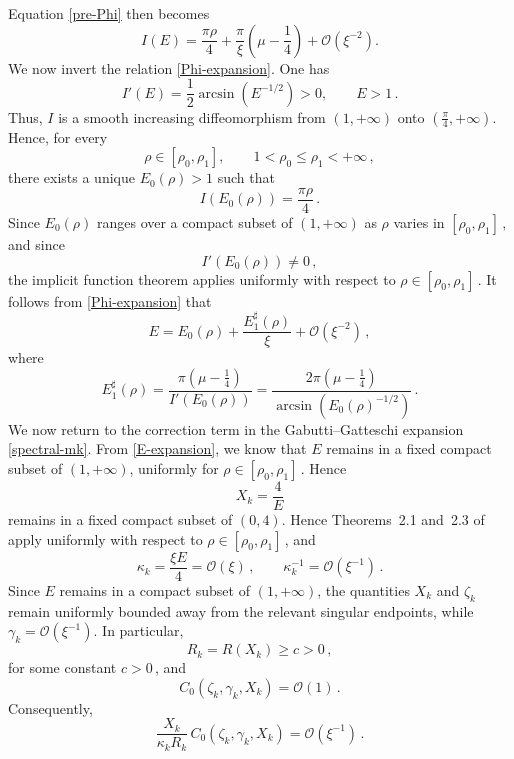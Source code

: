 \documentclass[11pt]{amsart}
\numberwithin{equation}{section}
\theoremstyle{remark}
\newcommand{\action}{I}
\begin{document}
Equation \eqref{pre-Phi} then becomes
\begin{equation}\label{Phi-expansion}
\action(E)
=
\frac{\pi\rho}{4}
+
\frac{\pi}{\xi}
\left(
\mu-\frac14
\right)
+
\mathcal O(\xi^{-2}).
\end{equation}
We now invert the relation \eqref{Phi-expansion}. One has
\begin{equation}\label{Phi-prime}
\action'(E)
=
\frac12\arcsin(E^{-1/2})
>0,
\qquad E>1\,.
\end{equation}
Thus, \(I\) is a smooth increasing diffeomorphism from
\((1,+\infty)\) onto \( (\frac{\pi}{4},+\infty) \). Hence, for every
\[
\rho\in[\rho_0,\rho_1],
\qquad 1<\rho_0\le \rho_1<+\infty\,,
\]
there exists a unique \(E_0(\rho)>1\) such that
\begin{equation}\label{E0-def}
\action(E_0(\rho))
=
\frac{\pi\rho}{4}\,.
\end{equation}
Since \(E_0(\rho)\) ranges over a compact subset of \((1,+\infty)\) as
\(\rho\) varies in \([\rho_0,\rho_1]\)\,, and since
\[
\action'(E_0(\rho))\neq 0\,,
\]
the implicit function theorem applies uniformly with respect to
\(\rho\in[\rho_0,\rho_1]\)\,. It follows from \eqref{Phi-expansion} that
\begin{equation}\label{E-expansion}
E
=
E_0(\rho)
+
\frac{E_1^{\sharp}(\rho)}{\xi}
+
\mathcal O(\xi^{-2})\,,
\end{equation}
where
\begin{equation}\label{E1-sharp-def}
E_1^{\sharp}(\rho)
=
\frac{\pi\left(\mu-\frac14\right)}
{\action'(E_0(\rho))}
=
\frac{2\pi\left(\mu-\frac14\right)}
{\arcsin(E_0(\rho)^{-1/2})}\,.
\end{equation}
We now return to the correction term in the Gabutti--Gatteschi expansion
\eqref{spectral-mk}. From \eqref{E-expansion}, we know that \(E\) remains
in a fixed compact subset of \((1,+\infty)\), uniformly for
\(\rho\in[\rho_0,\rho_1]\,\). Hence
\[
X_k=\frac4E
\]
remains in a fixed compact subset of \((0,4)\). Hence Theorems~2.1 and~2.3 of \cite{GG2001} apply uniformly with respect to
\(\rho\in[\rho_0,\rho_1]\)\,, and
\[
\kappa_k=\frac{\xi E}{4}=\mathcal O(\xi)\,,
\qquad
\kappa_k^{-1}=\mathcal O(\xi^{-1})\,.
\]
Since $E$ remains in a compact subset of $(1,+\infty)$, the quantities
$X_k$ and $\zeta_k$ remain uniformly bounded away from the relevant
singular endpoints, while $\gamma_k=\mathcal O(\xi^{-1})$. In particular,
\[
R_k=R(X_k)\geq c>0\,,
\]
for some constant $c>0\,$, and
\[
C_0(\zeta_k,\gamma_k,X_k)=\mathcal O(1)\,.
\]
Consequently,
\begin{equation}\label{GG-correction-size}
\frac{X_k}{\kappa_kR_k}
\,C_0(\zeta_k,\gamma_k,X_k)
=
\mathcal O(\xi^{-1})\,.
\end{equation}
\end{document}

